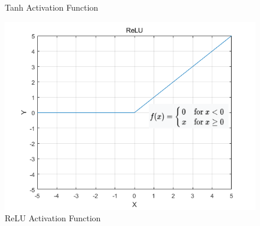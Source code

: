 \documentclass[english,version-2022-01]{uzl-thesis}
\begin{document}
\begin{itemize}
\begin{figure}[htbp]
\begin{minipage}{0.49\linewidth}
            \caption{Tanh Activation Function}
            \label{Tanh}
	\end{minipage}
	\begin{minipage}{0.49\linewidth}
		\centering
		\includegraphics[width=0.9\linewidth]{pic/ReLU.png}
            \caption{ReLU Activation Function}
            \label{ReLU}
	\end{minipage}
\end{figure}
\end{itemize}
\end{document}
